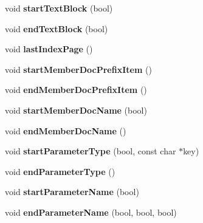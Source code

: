 \begin{DoxyCompactItemize}
void {\bfseries start\+Text\+Block} (bool)
\item 
\mbox{\label{class_docbook_generator_a37dd19581a2c9f61a82446e2b066f4ca}} 
void {\bfseries end\+Text\+Block} (bool)
\item 
\mbox{\label{class_docbook_generator_a9889919e0ddeb5c8047cedd9e2e2f2e3}} 
void {\bfseries last\+Index\+Page} ()
\item 
\mbox{\label{class_docbook_generator_a80da16bbc96ed97bfb2a19adaa844246}} 
void {\bfseries start\+Member\+Doc\+Prefix\+Item} ()
\item 
\mbox{\label{class_docbook_generator_a23d3d93e8e6022e07d22e713925e55b8}} 
void {\bfseries end\+Member\+Doc\+Prefix\+Item} ()
\item 
\mbox{\label{class_docbook_generator_a44db5093a052aa888696f9e0e0819dda}} 
void {\bfseries start\+Member\+Doc\+Name} (bool)
\item 
\mbox{\label{class_docbook_generator_a0d198a35494e4407f919bcfe38c7b5a2}} 
void {\bfseries end\+Member\+Doc\+Name} ()
\item 
\mbox{\label{class_docbook_generator_aa6e679829873cfa8fbdd6a337f12b5a2}} 
void {\bfseries start\+Parameter\+Type} (bool, const char $\ast$key)
\item 
\mbox{\label{class_docbook_generator_a2be2ebed3e76609535d64c0b81887a87}} 
void {\bfseries end\+Parameter\+Type} ()
\item 
\mbox{\label{class_docbook_generator_ad0f2cec44f639c4e8683e0ffb19fd7e0}} 
void {\bfseries start\+Parameter\+Name} (bool)
\item 
\mbox{\label{class_docbook_generator_ae0ffcd84340eacbe646826f7d4653f45}} 
void {\bfseries end\+Parameter\+Name} (bool, bool, bool)
\item 
\mbox{\label{class_docbook_generator_a3d7bbf541c06262c0288db95b721efac}} 

\end{DoxyCompactItemize}
